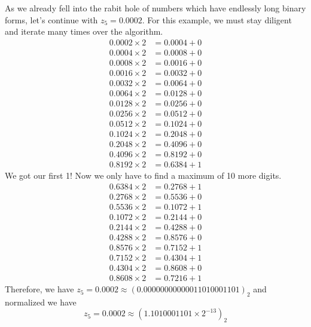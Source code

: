\begin{exmp}
    As we already fell into the rabit hole of numbers which have endlessly long binary forms, let's continue with \(z_5 = 0.0002\). For this example, we must stay diligent and iterate many times over the algorithm.
    \begin{align*}
        0.0002 \times 2 &= 0.0004 + 0 \\
        0.0004 \times 2 &= 0.0008 + 0 \\
        0.0008 \times 2 &= 0.0016 + 0 \\
        0.0016 \times 2 &= 0.0032 + 0 \\
        0.0032 \times 2 &= 0.0064 + 0 \\
        0.0064 \times 2 &= 0.0128 + 0 \\
        0.0128 \times 2 &= 0.0256 + 0 \\
        0.0256 \times 2 &= 0.0512 + 0 \\
        0.0512 \times 2 &= 0.1024 + 0 \\
        0.1024 \times 2 &= 0.2048 + 0 \\
        0.2048 \times 2 &= 0.4096 + 0 \\
        0.4096 \times 2 &= 0.8192 + 0 \\
        0.8192 \times 2 &= 0.6384 + 1
    \end{align*}
    We got our first 1! Now we only have to find a maximum of 10 more digits.
    \begin{align*}
        0.6384 \times 2 &= 0.2768 + 1 \\
        0.2768 \times 2 &= 0.5536 + 0 \\
        0.5536 \times 2 &= 0.1072 + 1 \\
        0.1072 \times 2 &= 0.2144 + 0 \\
        0.2144 \times 2 &= 0.4288 + 0 \\
        0.4288 \times 2 &= 0.8576 + 0 \\
        0.8576 \times 2 &= 0.7152 + 1 \\
        0.7152 \times 2 &= 0.4304 + 1 \\
        0.4304 \times 2 &= 0.8608 + 0 \\
        0.8608 \times 2 &= 0.7216 + 1
    \end{align*}
    Therefore, we have \(z_5 = 0.0002 \approx (0.00000000000011010001101)_2\) and normalized we have
    \begin{equation*}
        z_5 = 0.0002 \approx (1.1010001101 \times 2^{-13})_2
    \end{equation*}
\end{exmp}
